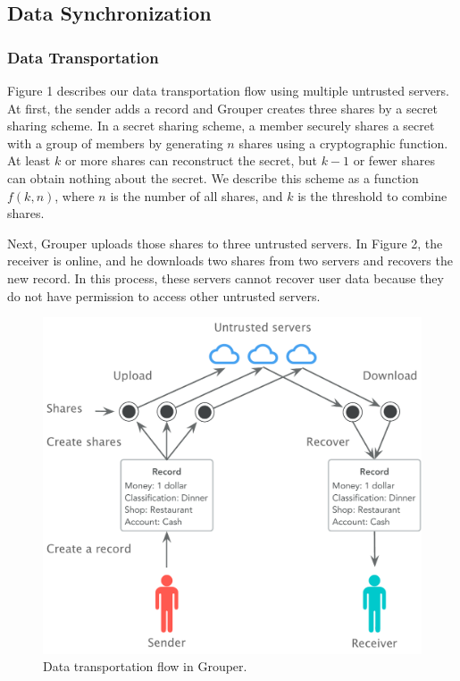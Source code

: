 \documentclass[twocolumn,10pt]{article}
\begin{document}
\subsection{Data Synchronization}

\subsubsection{Data Transportation}

Figure 1 describes our data transportation flow using multiple untrusted servers. 
At first, the sender adds a record and Grouper creates three shares by a secret sharing scheme. 
In a secret sharing scheme, a member securely shares a secret with a group of members by generating $n$ shares using a cryptographic function\cite{smith2013layered}. 
At least $k$ or more shares can reconstruct the secret, but $k-1$ or fewer shares can obtain nothing about the secret\cite{pang2005new}. 
We describe this scheme as a function $f(k, n)$, where $n$ is the number of all shares, and $k$ is the threshold to combine shares. 
 
Next, Grouper uploads those shares to three untrusted servers. 
In Figure 2, the receiver is online, and he downloads two shares from two servers and recovers the new record. 
In this process, these servers cannot recover user data because they do not have permission to access other untrusted servers. 

\begin{figure}[t]
	\centering
	\includegraphics[scale=0.36]{sync_flow}
	\caption{Data transportation flow in Grouper.}
\end{figure}
\end{document}
